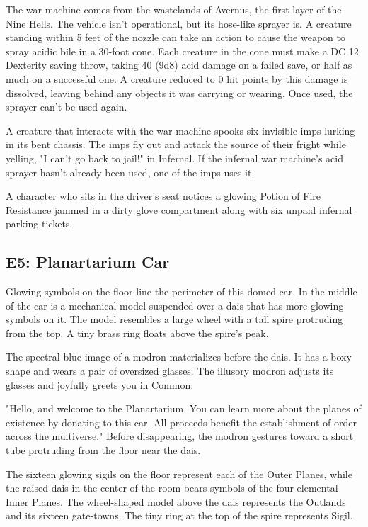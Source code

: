 \documentclass[10pt,a4paper,twoside,bg=print,twocolumn,openany,nodeprecatedcode]{dndarticle}
\begin{document}
The war machine comes from the wastelands of Avernus, the first layer of the Nine Hells. The vehicle isn't operational, but its hose-like sprayer is. A creature standing within 5 feet of the nozzle can take an action to cause the weapon to spray acidic bile in a 30-foot cone. Each creature in the cone must make a DC 12 Dexterity saving throw, taking 40 (9d8) acid damage on a failed save, or half as much on a successful one. A creature reduced to 0 hit points by this damage is dissolved, leaving behind any objects it was carrying or wearing. Once used, the sprayer can't be used again.

A creature that interacts with the war machine spooks six invisible imps lurking in its bent chassis. The imps fly out and attack the source of their fright while yelling, "I can't go back to jail!" in Infernal. If the infernal war machine's acid sprayer hasn't already been used, one of the imps uses it.

A character who sits in the driver's seat notices a glowing Potion of Fire Resistance jammed in a dirty glove compartment along with six unpaid infernal parking tickets.

\subsection{E5: Planartarium Car}
\begin{DndReadAloud}{}
Glowing symbols on the floor line the perimeter of this domed car. In the middle of the car is a mechanical model suspended over a dais that has more glowing symbols on it. The model resembles a large wheel with a tall spire protruding from the top. A tiny brass ring floats above the spire's peak.

The spectral blue image of a modron materializes before the dais. It has a boxy shape and wears a pair of oversized glasses. The illusory modron adjusts its glasses and joyfully greets you in Common:

"Hello, and welcome to the Planartarium. You can learn more about the planes of existence by donating to this car. All proceeds benefit the establishment of order across the multiverse." Before disappearing, the modron gestures toward a short tube protruding from the floor near the dais.

\end{DndReadAloud}

The sixteen glowing sigils on the floor represent each of the Outer Planes, while the raised dais in the center of the room bears symbols of the four elemental Inner Planes. The wheel-shaped model above the dais represents the Outlands and its sixteen gate-towns. The tiny ring at the top of the spire represents Sigil.
\end{document}
